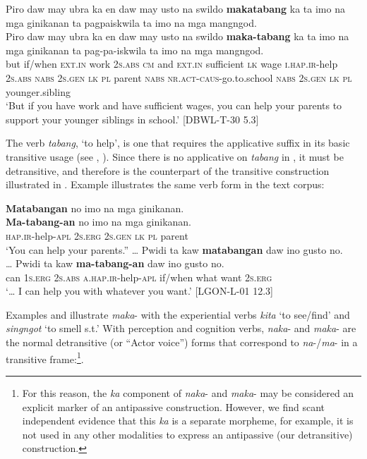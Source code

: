 \ea
\label{bkm:Ref447963006}
Piro  daw  may  ubra  ka  en  daw  may  usto  na  swildo \textbf{makatabang}  ka  ta  imo  na  mga  ginikanan  ta pagpaiskwila  ta  imo  na  mga  mangngod. \\\smallskip
 \gll Piro  daw  may  ubra  ka  en  daw  may  usto  na  swildo \textbf{maka-tabang}  ka  ta  imo  na  mga  ginikanan  ta pag-pa-iskwila  ta  imo  na  mga  mangngod. \\
but  if/when  \textsc{ext.in}  work  2\textsc{s.abs}  \textsc{cm}  and  \textsc{ext.in}  sufficient  \textsc{lk}  wage
\textsc{i.hap.ir}-help  2\textsc{s.abs}  \textsc{nabs}  2\textsc{s.gen}  \textsc{lk}  \textsc{pl}  parent  \textsc{nabs}
\textsc{nr.act}-\textsc{caus}-go.to.school  \textsc{nabs}  2\textsc{s.gen}  \textsc{lk}  \textsc{pl}  younger.sibling \\
\glt `But if you have work and have sufficient wages, you can help your parents to support your younger siblings in school.’ [DBWL-T-30 5.3]
\z

The verb \textit{tabang}, ‘to help’, is one that requires the applicative suffix in its basic transitive usage (see , ). Since there is no applicative on \textit{tabang} in , it must be detransitive, and therefore is the counterpart of the transitive construction illustrated in . Example  illustrates the same verb form in the text corpus:

\ea
\label{bkm:Ref448035920}
\textbf{Matabangan}  no  imo  na  mga  ginikanan. \\\smallskip
 \gll \textbf{Ma-tabang-an}  no  imo  na  mga  ginikanan. \\
\textsc{hap.ir}-help-\textsc{apl}  2\textsc{s.erg} 2\textsc{s.gen}  \textsc{lk}  \textsc{pl}  parent \\
\glt ‘You can help your parents.”
\z
\ea
\label{bkm:Ref120014772}
… Pwidi   ta  kaw  \textbf{matabangan}  daw  ino  gusto  no. \\\smallskip
 \gll … Pwidi   ta  kaw  \textbf{ma-tabang-an}  daw  ino  gusto  no. \\
{} can  1\textsc{s.erg}  2\textsc{s.abs}  \textsc{a.hap.ir}-help-\textsc{apl} if/when  what  want  2\textsc{s.erg} \\
\glt ‘… I can help you with whatever you want.’ [LGON-L-01 12.3]
\z

Examples  and  illustrate \textit{maka}{}- with the experiential verbs \textit{kita} ‘to see/find’ and \textit{singngot} ‘to smell s.t.’ With perception and cognition verbs, \textit{naka}{}- and \textit{maka}{}- are the normal detransitive (or “Actor voice”) forms that correspond to \textit{na}{}-/\textit{ma}{}- in a transitive frame:\footnote{For this reason, the \textit{ka} component of \textit{naka}{}- and \textit{maka}{}- may be considered an explicit marker of an antipassive construction. However, we find scant independent evidence that this \textit{ka} is a separate morpheme, for example, it is not used in any other modalities to express an antipassive (our detransitive) construction.}.


